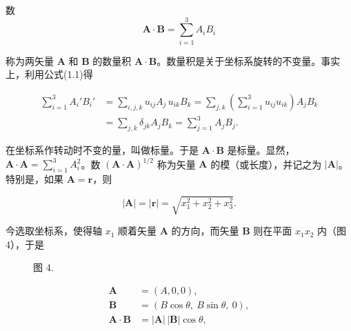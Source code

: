 \documentclass[11pt,a4paper,oneside]{ctexbook}
\newcommand{\ve}[1]{\bm{#1}}
\begin{document}
数
\begin{equation*}
\ve{A} \cdot \ve{B} = \sum_{i=1}^{3} A_i B_i
\end{equation*}

称为两矢量 $\ve{A}$ 和 $\ve{B}$ 的数量积 $\ve{A} \cdot \ve{B}$。数量积是关于坐标系旋转的不变量。事实上，利用公式(1.1)得

\begin{equation*}
\begin{aligned}
\sum_{i=1}^{3} A_i' B_i'
&= \sum_{i,j,k} u_{ij} A_j\, u_{ik} B_k
 = \sum_{j,k} \left(\sum_{i=1}^{3} u_{ij} u_{ik}\right) A_j B_k\\
&= \sum_{j,k} \delta_{jk} A_j B_k = \sum_{j=1}^{3} A_j B_j.
\end{aligned}
\end{equation*}

在坐标系作转动时不变的量，叫做标量。于是 $\ve{A} \cdot \ve{B}$ 是标量。显然，$\ve{A} \cdot \ve{A} = \sum_{i=1}^{3} A_i^{2}$。数 $(\ve{A} \cdot \ve{A})^{1/2}$ 称为矢量 $\ve{A}$ 的模（或长度），并记之为 $|\ve{A}|$。特别是，如果 $\ve{A} = \ve{r}$，则

\begin{equation*}
|\ve{A}| = |\ve{r}| = \sqrt{x_1^{2} + x_2^{2} + x_3^{2}}.
\end{equation*}

今选取坐标系，使得轴 $x_1$ 顺着矢量 $\ve{A}$ 的方向，而矢量 $\ve{B}$ 则在平面 $x_1 x_2$ 内（图 4），于是

\begin{figure}[htbp]
\centering
{}
\par\vspace{2pt}
{\small 图 4.}
\end{figure}

\begin{equation*}
\begin{aligned}
\ve{A} &= (A, 0, 0),\\
\ve{B} &= (B \cos\theta,\ B \sin\theta,\ 0),\\
\ve{A} \cdot \ve{B} &= |\ve{A}|\,|\ve{B}| \cos\theta,
\end{aligned}
\end{equation*}
\end{document}
